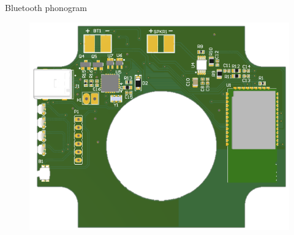 \documentclass[aspectratio=169]{beamer}
\begin{document}
\begin{frame}{Bluetooth phonogram}
\begin{figure}[H]
\begin{columns}[T]
\begin{column}{.3\linewidth}
        \includegraphics[width=\linewidth]{images/BluetoothPhonogram3}
      \end{column}
    \end{columns}
  \end{figure}
\end{frame}
\end{document}
